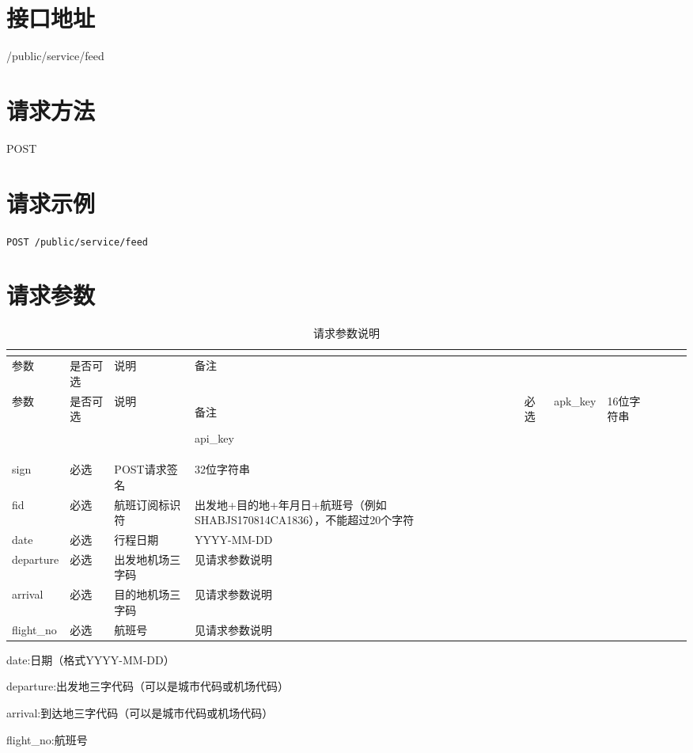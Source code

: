 \section{接口地址}

/public/service/feed

\section{请求方法}


POST

\section{请求示例}

\texttt{POST /public/service/feed}


\section{请求参数}



\begin{longtable}{|m{60pt}|m{50pt}|m{90pt}|m{180pt}|}
\tabularnewline\hline
参数&是否可选&说明&备注
\endhead

\caption{请求参数说明}\\
\hline
参数&是否可选&说明&备注
\endfirsthead

\endfoot

\endlastfoot
\hline
api\_key   & 必选  & apk\_key & 16位字符串\\
\hline
sign            &必选  & POST请求签名&32位字符串\\
\hline
fid               & 必选 & 航班订阅标识符&出发地+目的地+年月日+航班号（例如SHABJS170814CA1836），不能超过20个字符\\
\hline
date	            &必选 & 行程日期         &YYYY-MM-DD\\
\hline
departure &必选 &	出发地机场三字码 &见请求参数说明\\
\hline
arrival        &必选 & 目的地机场三字码 &见请求参数说明\\
\hline
flight\_no &必选 & 航班号             &见请求参数说明\\
\hline
\end{longtable}

\begin{compactitem}
\item date:日期（格式YYYY-MM-DD）
\item departure:出发地三字代码（可以是城市代码或机场代码）
\item arrival:到达地三字代码（可以是城市代码或机场代码）
\item flight\_no:航班号
\end{compactitem}

